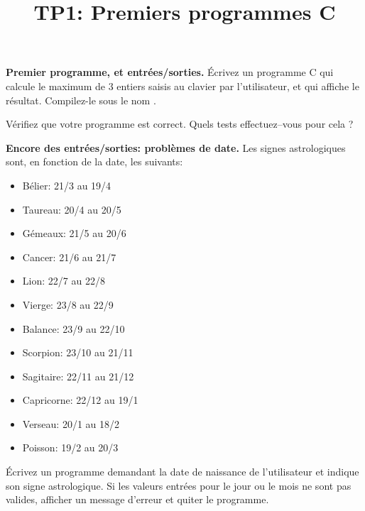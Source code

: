 \documentclass[10pt]{article}\usepackage[correction]{esial}
\begin{document}
\title{TP1: Premiers programmes C}
\maketitle


\Exercice \textbf{Premier programme, et entrées/sorties.}
\Question Écrivez un programme C qui calcule le maximum de 3 entiers saisis au
clavier par l'utilisateur, et qui affiche le résultat. Compilez-le sous le nom
. 


\Question Vérifiez que votre programme est correct. Quels tests effectuez--vous
pour cela ?


\Exercice \textbf{Encore des entrées/sorties: problèmes de date.}
Les signes astrologiques sont, en fonction de la date, les suivants: 


\begin{minipage}{.3\linewidth}
  \begin{itemize}
  \item Bélier: 21/3 au 19/4
  \item Taureau: 20/4 au 20/5
  \item Gémeaux: 21/5 au 20/6
  \item Cancer: 21/6 au 21/7
  \end{itemize}
\end{minipage}\hfill\begin{minipage}{.3\linewidth}
  \begin{itemize}
  \item Lion: 22/7 au 22/8
  \item Vierge: 23/8 au 22/9
  \item Balance: 23/9 au 22/10
  \item Scorpion: 23/10 au 21/11
  \end{itemize}
\end{minipage}\hfill\begin{minipage}{.3\linewidth}
  \begin{itemize}
  \item Sagitaire: 22/11 au 21/12
  \item Capricorne: 22/12 au 19/1
  \item Verseau: 20/1 au 18/2
  \item Poisson: 19/2 au 20/3
  \end{itemize}
\end{minipage}

\Question Écrivez un programme demandant la date de naissance de l'utilisateur
et indique son signe astrologique. Si les valeurs entrées pour le jour ou le
mois ne sont pas valides, afficher un message d'erreur et quiter le programme.
\end{document}
